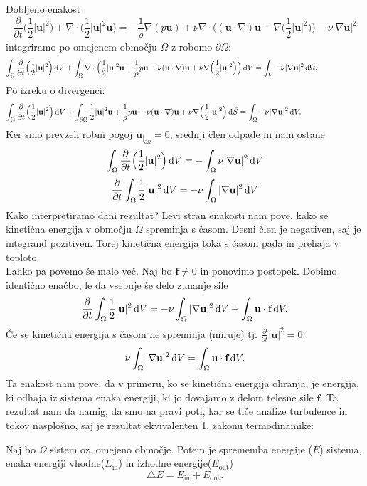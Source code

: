 \documentclass[mat2, tisk]{fmfdelo}
\newcommand{\bd}{\textbf}
\begin{document}
Dobljeno enakost 
$$
\frac{\partial}{\partial t} \Big(\frac{1}{2} |\bd{u}|^2 \Big) + \nabla \cdot \Big(\frac{1}{2} |\bd{u}|^2 \bd{u}\Big) = 
-\frac{1}{\rho}\nabla(p \bd{u}) + \nu \nabla\cdot\Big((\bd{u}\cdot \nabla)\bd{u} - \nabla\Big(\frac{1}{2} |\bd{u}|^2\Big)\Big) - \nu|\nabla \bd{u}|^2
$$
integriramo po omejenem območju $\Omega$ z robomo $\partial \Omega$:
\begin{align*}
\int_\Omega \frac{\partial}{\partial t} \Big(\frac{1}{2} |\bd{u}|^2 \Big)\dif V + \int_\Omega \nabla \cdot\Big(\frac{1}{2} |\bd{u}|^2 \bd{u}+\frac{1}{\rho}p \bd{u} - \nu(\bd{u}\cdot \nabla)\bd{u} + \nu\nabla\Big(\frac{1}{2} |\bd{u}|^2\Big)\Big)\dif V =\int_V - \nu|\nabla \bd{u}|^2 \dif \Omega.\qquad\qquad\qquad
\end{align*}
Po izreku o divergenci:
\begin{align*}
  \int_\Omega \frac{\partial}{\partial t} \Big(\frac{1}{2} |\bd{u}|^2 \Big)\dif V + \int_{\partial\Omega} \frac{1}{2} |\bd{u}|^2 \bd{u}
  +\frac{1}{\rho}p \bd{u} - \nu(\bd{u}\cdot \nabla)\bd{u} + \nu\nabla\Big(\frac{1}{2} |\bd{u}|^2\Big)\dif \vec{S} =\int_\Omega - \nu|\nabla \bd{u}|^2 \dif V.\qquad\qquad\qquad\qquad
\end{align*}
Ker smo prevzeli robni pogoj $\bd{u}_{|_{\partial\Omega}} = 0$, srednji člen odpade in nam ostane 
$$
\int_\Omega \frac{\partial}{\partial t} \Big(\frac{1}{2} |\bd{u}|^2 \Big)\dif V = - \int_\Omega\nu|\nabla \bd{u}|^2 \dif V
$$
$$
\frac{\partial}{\partial t}\int_\Omega \frac{1}{2} |\bd{u}|^2 \dif V = - \nu\int_\Omega |\nabla \bd{u}|^2 \dif V
$$
\newpage
Kako interpretiramo dani rezultat? Levi stran enakosti nam pove, kako se kinetična energija 
v območju $\Omega$ spreminja s časom. Desni člen je negativen, saj je integrand pozitiven.
Torej kinetična energija toka s časom pada in prehaja v toploto.\\
Lahko pa povemo še malo več. Naj bo $\bd{f} \neq 0$ in ponovimo postopek. Dobimo identično enačbo, le da vsebuje še delo zunanje sile
\begin{equation}
\frac{\partial}{\partial t}\int_\Omega \frac{1}{2} |\bd{u}|^2 \dif V = - \nu\int_\Omega |\nabla \bd{u}|^2 \dif V + \int_\Omega \bd{u}\cdot \bd{f} \dif V.
\end{equation}
Če se kinetična energija s časom ne spreminja (miruje) tj. $\frac{\partial}{\partial t} |\bd{u}|^2 = 0$:
$$
 \nu\int_\Omega |\nabla \bd{u}|^2 \dif V = \int_\Omega \bd{u}\cdot \bd{f} \dif V.
$$
Ta enakost nam pove, da v primeru, ko se kinetična energija ohranja, je energija, ki odhaja iz sistema enaka energiji, ki jo dovajamo z delom telesne sile $\bd{f}$.
Ta rezultat nam da namig, da smo na pravi poti, kar se tiče analize turbulence in tokov
nasplošno, saj je rezultat ekvivalenten 1. zakonu termodinamike:
\begin{definicija}
Naj bo $\Omega$ sistem oz. omejeno območje. Potem je sprememba energije ($E$) sistema, 
enaka energiji vhodne($E_\text{in}$) in izhodne energije($E_{\text{out}}$)
\begin{equation}
\triangle E = E_\text{in} + E_{\text{out}}.
\end{equation}
\end{definicija}
\end{document}
